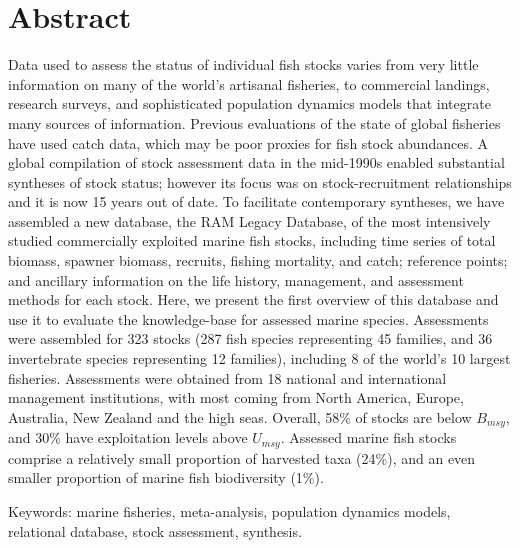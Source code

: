 \section*{Abstract}

Data used to assess the status of individual fish stocks varies from
very little information on many of the world's artisanal fisheries, to
commercial landings, research surveys, and sophisticated population
dynamics models that integrate many sources of information.  Previous
evaluations of the state of global fisheries have used catch data,
which may be poor proxies for fish stock abundances. A global
compilation of stock assessment data in the mid-1990s enabled
substantial syntheses of stock status; however its focus was on
stock-recruitment relationships and it is now 15 years out of date. To
facilitate contemporary syntheses, we have assembled a new database,
the RAM Legacy Database, of the most intensively studied commercially
exploited marine fish stocks, including time series of total biomass,
spawner biomass, recruits, fishing mortality, and catch; reference
points; and ancillary information on the life history, management, and
assessment methods for each stock.  Here, we present the first
overview of this database and use it to evaluate the knowledge-base
for assessed marine species.  Assessments were assembled for
323 stocks (287 fish species
representing 45 families, and
36 invertebrate species representing
12 families), including 8 of the world's 10
largest fisheries. Assessments were obtained from 18 national and
international management institutions, with most coming from North
America, Europe, Australia, New Zealand and the high seas.  Overall,
58\% of stocks are below $B_{msy}$, and 30\% have exploitation levels above
$U_{msy}$.  Assessed marine fish stocks comprise a relatively small
proportion of harvested taxa (24\%), and an even smaller proportion of
marine fish biodiversity (1\%).



\noindent Keywords: marine fisheries, meta-analysis, population dynamics models, relational database, stock assessment, synthesis.


